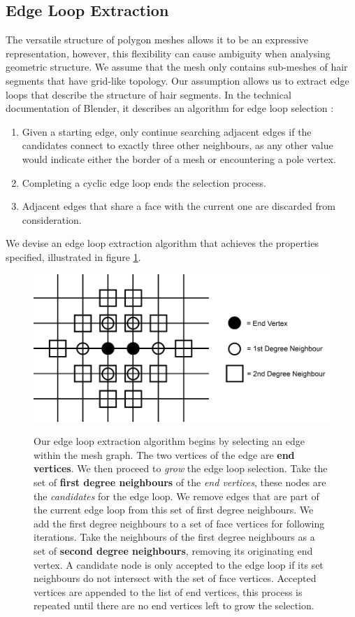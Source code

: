 \documentclass[ %
author={Dillon Keith Diep},
supervisor={Dr. Carl Henrik Ek},
degree={MEng},
title={ART-CG:},
subtitle={Assisted Real-time Content Generation of 3D Hair by Learning Manifolds},
type={Research},
year={2017} ]{dissertation}
\begin{document}
\subsection{Edge Loop Extraction}
The versatile structure of polygon meshes allows it to be an expressive representation, however, this flexibility can cause ambiguity when analysing geometric structure. We assume that the mesh only contains sub-meshes of hair segments that have grid-like topology. Our assumption allows us to extract edge loops that describe the structure of hair segments. In the technical documentation of Blender, it describes an algorithm for edge loop selection \cite{blenderedgeloop}:
\begin{enumerate}
\item Given a starting edge, only continue searching adjacent edges if the candidates connect to exactly three other neighbours, as any other value would indicate either the border of a mesh or encountering a pole vertex.
\item Completing a cyclic edge loop ends the selection process.
\item Adjacent edges that share a face with the current one are discarded from consideration.
\end{enumerate}
We devise an edge loop extraction algorithm that achieves the properties specified, illustrated in figure \ref{edgeLoopFig}.

\begin{figure}[!h]
	\centering
	\caption{Our edge loop extraction algorithm begins by selecting an edge within the mesh graph. The two vertices of the edge are \textbf{end vertices}. We then proceed to \textit{grow} the edge loop selection. Take the set of \textbf{first degree neighbours} of the \textit{end vertices}, these nodes are the \textit{candidates} for the edge loop. We remove edges that are part of the current edge loop from this set of first degree neighbours. We add the first degree neighbours to a set of face vertices for following iterations. Take the neighbours of the first degree neighbours as a set of \textbf{second degree neighbours}, removing its originating end vertex. A candidate node is only accepted to the edge loop if its set neighbours do not intersect with the set of face vertices. Accepted vertices are appended to the list of end vertices, this process is repeated until there are no end vertices left to grow the selection.}
	\includegraphics[scale=0.35]{images/edgeLoopDiagram}\\
	
	\label{edgeLoopFig}
\end{figure}
\end{document}
